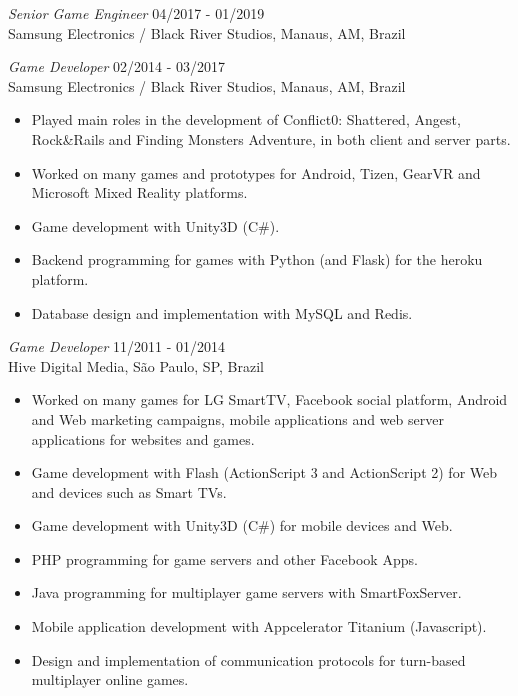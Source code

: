\documentclass[line,margin]{res}
\begin{document}
\begin{resume}
		{\sl Senior Game Engineer} \hfill 04/2017 - 01/2019 \\
                Samsung Electronics / Black River Studios, Manaus, AM, Brazil

                {\sl Game Developer} \hfill 02/2014 - 03/2017 \\
                Samsung Electronics / Black River Studios, Manaus, AM, Brazil
                 \begin{itemize}  \itemsep 1.25pt
                 \item Played main roles in the development of Conflict0: Shattered, Angest, Rock\&Rails and Finding Monsters Adventure, in both client and server parts.
                 \item Worked on many games and prototypes for Android, Tizen, GearVR and Microsoft Mixed Reality platforms.
                 \item Game development with Unity3D (C\#).
				 \item Backend programming for games with Python (and Flask) for the heroku platform.
                 \item Database design and implementation with MySQL and Redis.
                 \end{itemize}
                 
				{\sl Game Developer} \hfill 11/2011 - 01/2014 \\
                Hive Digital Media, São Paulo, SP, Brazil
                 \begin{itemize}  \itemsep 1.25pt
                 \item Worked on many games for LG SmartTV, Facebook social platform, Android and Web marketing campaigns, mobile applications and web server applications for websites and games.
                 \item Game development with Flash (ActionScript 3 and ActionScript 2) for Web and devices such as Smart TVs.
		 		 \item Game development with Unity3D (C\#) for mobile devices and Web.
                 \item PHP programming for game servers and other Facebook Apps.
                 \item Java programming for multiplayer game servers with SmartFoxServer.
		 		 \item Mobile application development with Appcelerator Titanium (Javascript).
                 \item Design and implementation of communication protocols for turn-based multiplayer online games.
                 \end{itemize}
                 

\end{resume}
\end{document}

